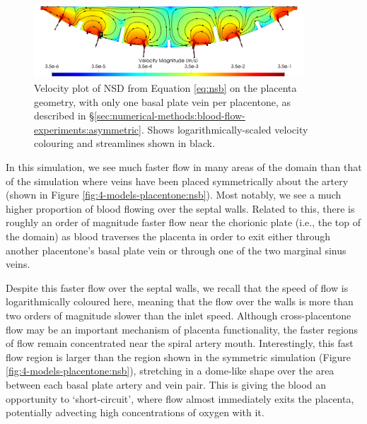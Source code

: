             \begin{figure}
                \includegraphics[width=0.9\textwidth]{diagrams/results-mri/simulated-placenta/simulated-placenta-velocity.png}
                \caption{Velocity plot of NSD from Equation \eqref{eq:nsb} on the placenta geometry, with only one basal plate vein per placentone, as described in \S\ref{sec:numerical-methods:blood-flow-experiments:asymmetric}. Shows logarithmically-scaled velocity colouring and streamlines shown in black.}
                \label{fig:asymmetric-placenta}
            \end{figure}

            In this simulation, we see much faster flow in many areas of the domain than that of the simulation where veins have been placed symmetrically about the artery (shown in Figure \ref{fig:4-models-placentone:nsb}). Most notably, we see a much higher proportion of blood flowing over the septal walls. Related to this, there is roughly an order of magnitude faster flow near the chorionic plate (i.e., the top of the domain) as blood traverses the placenta in order to exit either through another placentone's basal plate vein or through one of the two marginal sinus veins.
            
            Despite this faster flow over the septal walls, we recall that the speed of flow is logarithmically coloured here, meaning that the flow over the walls is more than two orders of magnitude slower than the inlet speed. Although cross-placentone flow may be an important mechanism of placenta functionality, the faster regions of flow remain concentrated near the spiral artery mouth. Interestingly, this fast flow region is larger than the region shown in the symmetric simulation (Figure \ref{fig:4-models-placentone:nsb}), stretching in a dome-like shape over the area between each basal plate artery and vein pair. This is giving the blood an opportunity to `short-circuit', where flow almost immediately exits the placenta, potentially advecting high concentrations of oxygen with it.

